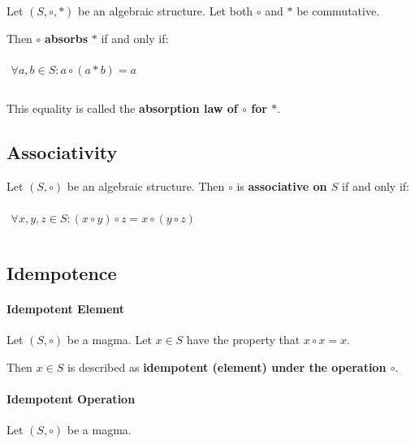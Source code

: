 Let $(S, \circ, *)$ be an algebraic structure. Let both $\circ$ and
$*$ be commutative.

Then $\circ$ \textbf{absorbs} $*$ if and only if:

\begin{math}
  \begin{array}{c}
    \\
    \forall a, b \in S: a \circ (a * b) = a\\
    \\
  \end{array}
\end{math}

This equality is called the \textbf{absorption law of $\circ$ for
  $*$}.



\subsection{Associativity}
\label{sec:associativity}

Let $(S, \circ)$ be an algebraic structure. Then $\circ$ is
\textbf{associative on $S$} if and only if:

\begin{math}
  \begin{array}{c}
    \\
    \forall x, y, z \in S: (x \circ y) \circ z = x \circ (y \circ z)\\
    \\
  \end{array}
\end{math}


\subsection{Idempotence}
\label{sec:idempotence}

\paragraph{Idempotent Element}
Let $(S, \circ)$ be a magma. Let $x \in S$ have the property that
$ x \circ x = x$.

Then $x \in S $ is described as \textbf{idempotent (element) under the
  operation $\circ$}.

\paragraph{Idempotent Operation}
Let $(S, \circ)$ be a magma.


